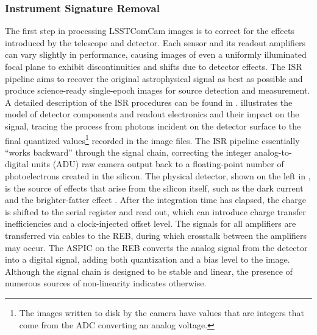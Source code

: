 \subsubsection{Instrument Signature Removal}
\label{ssec:isr}
The first step in processing \gls{LSSTComCam} images is to correct for the effects introduced by the telescope and detector.
Each sensor and its readout amplifiers can vary slightly in performance, causing images of even a uniformly illuminated focal plane to exhibit discontinuities and shifts due to detector effects.
The \gls{ISR} pipeline aims to recover the original astrophysical signal as best as possible and produce science-ready single-epoch images for source detection and measurement.
A detailed description of the \gls{ISR} procedures can be found in \citet{SITCOMTN-086,2025JATIS..11a1209P}.
 illustrates the model of detector components and readout electronics and their impact on the signal, tracing the process from photons incident on the detector surface to the final quantized values\footnote{The images written to disk by the camera have values that are integers that come from the ADC converting an analog voltage.} recorded in the image files.
The \gls{ISR} \gls{pipeline} essentially ``works backward'' through the signal chain, correcting the integer analog-to-digital units (ADU) raw camera output back to a floating-point number of photoelectrons created in the silicon.
The physical detector, shown on the left in  , is the source of effects that arise from the silicon itself, such as the dark current and the brighter-fatter effect \citep{doi:10.1088/1538-3873/aab820,2024PASP..136d5003B}.
After the integration time has elapsed, the charge is shifted  to the serial register and read out, which can introduce charge transfer inefficiencies and a clock-injected offset level.
The signals for all amplifiers are transferred via cables to the \gls{REB}, during which crosstalk between the amplifiers may occur.
The \gls{ASPIC} on the \gls{REB} converts the analog signal from the detector into a digital signal, adding both quantization and a bias level to the image.
Although the signal chain is designed to be stable and linear, the presence of numerous sources of non-linearity indicates otherwise.
